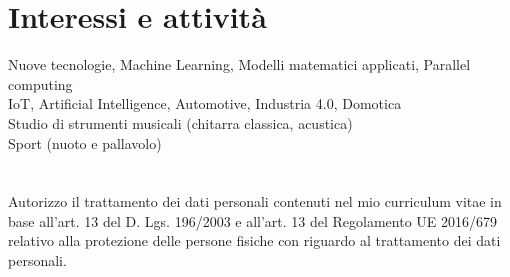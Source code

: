 \documentclass[a4paper,10pt]{article}
\begin{document}
\section{Interessi e attività}

Nuove tecnologie, Machine Learning, Modelli matematici applicati, Parallel computing\\
IoT, Artificial Intelligence, Automotive, Industria 4.0, Domotica\\
Studio di strumenti musicali (chitarra classica, acustica)\\
Sport (nuoto e pallavolo)


\section{}
Autorizzo il trattamento dei dati personali contenuti nel mio curriculum vitae in base all’art. 13 del D. Lgs. 196/2003 e all’art. 13 del Regolamento UE 2016/679 relativo alla protezione delle persone fisiche con riguardo al trattamento dei dati personali.
\end{document}
